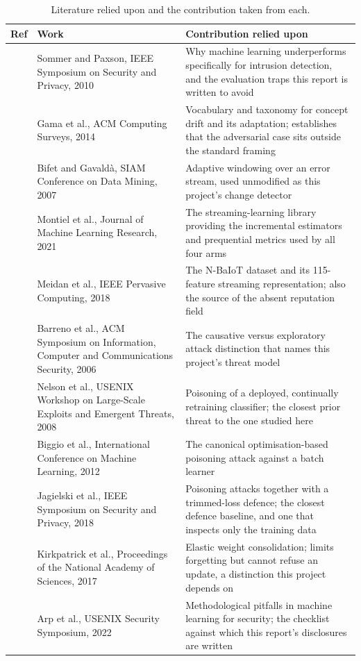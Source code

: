 \documentclass[12pt,a4paper]{report}
\begin{document}
\begin{table}[htbp]
\centering
\caption{Literature relied upon and the contribution taken from each.}
\label{tab:lit}
\small
\begin{tabular}{@{}p{0.6cm}p{4.1cm}p{8.0cm}@{}}
\toprule
\textbf{Ref} & \textbf{Work} & \textbf{Contribution relied upon}\\
\midrule
[1] & Sommer and Paxson, IEEE Symposium on Security and Privacy, 2010 &
Why machine learning underperforms specifically for intrusion detection, and the
evaluation traps this report is written to avoid\\
[2] & Gama et al., ACM Computing Surveys, 2014 &
Vocabulary and taxonomy for concept drift and its adaptation; establishes that
the adversarial case sits outside the standard framing\\
[3] & Bifet and Gavald\`a, SIAM Conference on Data Mining, 2007 &
Adaptive windowing over an error stream, used unmodified as this project's
change detector\\
[4] & Montiel et al., Journal of Machine Learning Research, 2021 &
The streaming-learning library providing the incremental estimators and
prequential metrics used by all four arms\\
[5] & Meidan et al., IEEE Pervasive Computing, 2018 &
The N-BaIoT dataset and its 115-feature streaming representation; also the
source of the absent reputation field\\
[6] & Barreno et al., ACM Symposium on Information, Computer and Communications
Security, 2006 &
The causative versus exploratory attack distinction that names this project's
threat model\\
[7] & Nelson et al., USENIX Workshop on Large-Scale Exploits and Emergent
Threats, 2008 &
Poisoning of a deployed, continually retraining classifier; the closest prior
threat to the one studied here\\
[8] & Biggio et al., International Conference on Machine Learning, 2012 &
The canonical optimisation-based poisoning attack against a batch learner\\
[9] & Jagielski et al., IEEE Symposium on Security and Privacy, 2018 &
Poisoning attacks together with a trimmed-loss defence; the closest defence
baseline, and one that inspects only the training data\\
[10] & Kirkpatrick et al., Proceedings of the National Academy of Sciences, 2017
&
Elastic weight consolidation; limits forgetting but cannot refuse an update, a
distinction this project depends on\\
[11] & Arp et al., USENIX Security Symposium, 2022 &
Methodological pitfalls in machine learning for security; the checklist against
which this report's disclosures are written\\
\bottomrule
\end{tabular}
\end{table}
\end{document}
